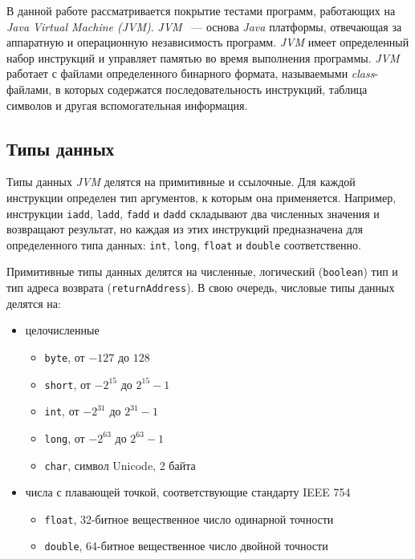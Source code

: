 В данной работе рассматривается покрытие тестами программ, работающих на \textit{Java Virtual Machine (JVM)}. \textit{JVM}~\cite{jvm_spec} 
--- основа \textit{Java} платформы, отвечающая за аппаратную и операционную независимость программ. \textit{JVM} имеет определенный набор инструкций и 
управляет памятью во время выполнения программы. \textit{JVM} работает с файлами определенного бинарного формата, называемыми \textit{class}-файлами, в которых 
содержатся последовательность инструкций, таблица символов и другая вспомогательная информация.

\subsection{Типы данных}
Типы данных \textit{JVM} делятся на примитивные и ссылочные. Для каждой инструкции определен тип аргументов, к которым она применяется. Например, инструкции 
\texttt{iadd}, \texttt{ladd}, \texttt{fadd} и \texttt{dadd} складывают два численных значения и возвращают результат, но каждая из этих инструкций 
предназначена для определенного типа данных: \texttt{int}, \texttt{long}, \texttt{float} и \texttt{double} соответственно.

Примитивные типы данных делятся на численные, логический (\texttt{boolean}) тип и тип адреса возврата (\texttt{returnAddress}). В свою очередь, числовые типы 
данных делятся на:
\begin{itemize}
 \item целочисленные
 \begin{itemize}
  \item \texttt{byte}, от $-127$ до $128$
  \item \texttt{short}, от $-2^{15}$ до $2^{15} - 1$
  \item \texttt{int}, от $-2^{31}$ до $2^{31} - 1$
  \item \texttt{long}, от $-2^{63}$ до $2^{63} - 1$
  \item \texttt{char}, символ Unicode, 2 байта
 \end{itemize}
 \item числа с плавающей точкой, соответствующие стандарту IEEE 754
 \begin{itemize}
  \item \texttt{float}, 32-битное вещественное число одинарной точности
  \item \texttt{double}, 64-битное вещественное число двойной точности
 \end{itemize}
\end{itemize}

